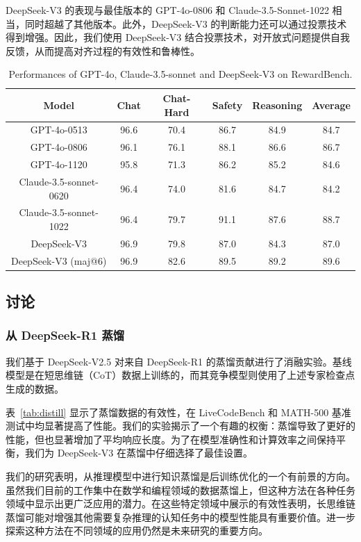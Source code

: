 \documentclass[lang=cn,a4paper,newtx]{elegantpaper}
\newcommand{\dsviii}{DeepSeek-V3}
\begin{document}
\dsviii{} 的表现与最佳版本的 GPT-4o-0806 和 Claude-3.5-Sonnet-1022 相当，同时超越了其他版本。此外，\dsviii{} 的判断能力还可以通过投票技术得到增强。因此，我们使用 \dsviii{} 结合投票技术，对开放式问题提供自我反馈，从而提高对齐过程的有效性和鲁棒性。

\begin{table}[t]
    \centering
    \begin{tabular}{c | c c c c c}
    \toprule
    \textbf{Model} & \textbf{Chat} & \textbf{Chat-Hard} & \textbf{Safety} & \textbf{Reasoning} & \textbf{Average} \\
    \midrule
    GPT-4o-0513 & 96.6 & 70.4 & 86.7 & 84.9 & 84.7\\
    GPT-4o-0806 & 96.1 & 76.1 & 88.1 & 86.6 & 86.7\\
    GPT-4o-1120 & 95.8 & 71.3 & 86.2 & 85.2 & 84.6\\
    \midrule 
    Claude-3.5-sonnet-0620 & 96.4 & 74.0 & 81.6 & 84.7 & 84.2\\
    Claude-3.5-sonnet-1022 & 96.4 & 79.7 & 91.1 & 87.6 & 88.7\\
    \midrule 
    \dsviii{} & 96.9 & 79.8 & 87.0 & 84.3 & 87.0\\
    \dsviii{} (maj@6) & 96.9 & 82.6 & 89.5 & 89.2 & 89.6\\
    \bottomrule
    \end{tabular}
    \caption{Performances of GPT-4o, Claude-3.5-sonnet and \dsviii{} on RewardBench.}
    \label{tab:rewardbench} 
\end{table}

\subsection{讨论}

\subsubsection{从 DeepSeek-R1 蒸馏}

我们基于 DeepSeek-V2.5 对来自 DeepSeek-R1 的蒸馏贡献进行了消融实验。基线模型是在短思维链（CoT）数据上训练的，而其竞争模型则使用了上述专家检查点生成的数据。

表~\ref{tab:distill} 显示了蒸馏数据的有效性，在 LiveCodeBench 和 MATH-500 基准测试中均显著提高了性能。我们的实验揭示了一个有趣的权衡：蒸馏导致了更好的性能，但也显著增加了平均响应长度。为了在模型准确性和计算效率之间保持平衡，我们为 \dsviii{} 在蒸馏中仔细选择了最佳设置。

我们的研究表明，从推理模型中进行知识蒸馏是后训练优化的一个有前景的方向。虽然我们目前的工作集中在数学和编程领域的数据蒸馏上，但这种方法在各种任务领域中显示出更广泛应用的潜力。在这些特定领域中展示的有效性表明，长思维链蒸馏可能对增强其他需要复杂推理的认知任务中的模型性能具有重要价值。进一步探索这种方法在不同领域的应用仍然是未来研究的重要方向。
\end{document}
